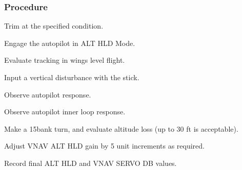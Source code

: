 \subsubsection*{Procedure}
 \begin{compactenum}
    \item Trim at the specified condition.
    \item Engage the autopilot in ALT HLD Mode.
    \item Evaluate tracking in wings level flight.
    \item Input a vertical disturbance with the stick.  
    \item Observe autopilot response.
    \item Observe autopilot inner loop response.
    \item Make a 15\textdegree bank turn, and evaluate altitude loss (up to 30 ft is acceptable).
    \item Adjust VNAV ALT HLD gain by 5 unit increments as required.
    \item Record final ALT HLD and VNAV SERVO DB values.
    \end{compactenum}
